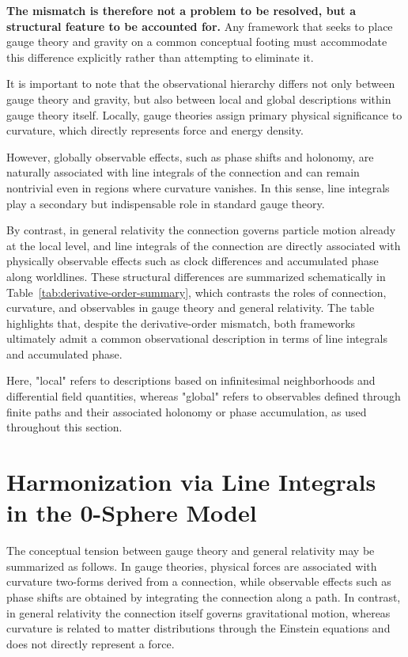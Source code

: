 \documentclass[12pt,letterpaper]{article} %
\begin{document}
\textbf{The mismatch is therefore not a problem to be resolved, but a structural feature to be accounted for.} Any framework that seeks to place gauge theory and gravity on a common conceptual footing must accommodate this difference explicitly rather than attempting to eliminate it.

It is important to note that the observational hierarchy differs not only between gauge theory and gravity, but also between local and global descriptions within gauge theory itself. Locally, gauge theories assign primary physical significance to curvature, which directly represents force and energy density.

However, globally observable effects, such as phase shifts and holonomy, are naturally associated with line integrals of the connection and can remain nontrivial even in regions where curvature vanishes.
In this sense, line integrals play a secondary but indispensable role in standard gauge theory.

By contrast, in general relativity the connection governs particle motion already at the local level, and line integrals of the connection are directly associated with physically observable effects such as clock differences and accumulated phase along worldlines. These structural differences are summarized schematically in Table~\ref{tab:derivative-order-summary}, which contrasts the roles of connection, curvature, and observables in gauge theory and general relativity. The table highlights that, despite the derivative-order mismatch, both frameworks ultimately admit a common observational description in terms of line integrals and accumulated phase.

Here, "local" refers to descriptions based on infinitesimal neighborhoods and differential field quantities, whereas "global" refers to observables defined through finite paths and their associated holonomy or phase accumulation, as used throughout this section.


\section{Harmonization via Line Integrals in the 0-Sphere Model}

\justifying
The conceptual tension between gauge theory and general relativity may be summarized as follows. In gauge theories, physical forces are associated with curvature two-forms derived from a connection, while observable effects such as phase shifts are obtained by integrating the connection along a path. In contrast, in general relativity the connection itself governs gravitational motion, whereas curvature is related to matter distributions through the Einstein equations and does not directly represent a force.
\end{document}
